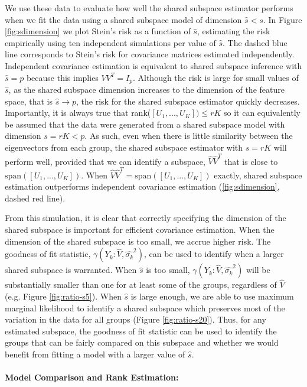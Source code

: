 \documentclass[12pt]{article}
\begin{document}
We use these data to evaluate how well the shared subspace estimator
performs when we fit the data using a shared subspace model of
dimension $\hat{s} < s$.  In Figure \ref{fig:sdimension} we plot
Stein's risk as a function of $\hat{s}$, estimating the risk
empirically using ten independent simulations per value of $\hat{s}$.
The dashed blue line corresponds to Stein's risk for covariance
matrices estimated independently.  Independent covariance estimation
is equivalent to shared subspace inference with $\hat{s} = p$ because
this implies $VV^T = I_p$.  Although the risk is large for small
values of $\hat{s}$, as the shared subspace dimension increases to the
dimension of the feature space, that is $\hat{s} \rightarrow p$, the
risk for the shared subspace estimator quickly decreases.
Importantly, it is always true that rank($[U_1, ..., U_K]) \leq rK$ so
it can equivalently be assumed that the data were generated from a
shared subspace model with dimension $s = rK < p$.  As such, even when
there is little similarity between the eigenvectors from each group,
the shared subspace estimator with $\hat{s} = rK$ will perform well,
provided that we can identify a subspace, $\hat{V}\hat{V}^T$ that is
close to $\text{span}([U_1, ..., U_K])$. When
$\hat{V}\hat{V}^T = \text{span}([U_1, ..., U_K])$ exactly, shared
subspace estimation outperforms independent covariance estimation
(\ref{fig:sdimension}, dashed red line).

From this simulation, it is clear that correctly specifying the
dimension of the shared subspace is important for efficient covariance
estimation.  When the dimension of the shared subspace is too small,
we accrue higher risk.  The goodness of fit statistic,
$\gamma(Y_k: \hat{V}, \hat{\sigma_k}^2)$, can be used to identify when
a larger shared subspace is warranted.  When $\hat{s}$ is too small,
$\gamma(Y_k: \hat{V}, \hat{\sigma_k}^2)$ will be substantially smaller
than one for at least some of the groups, regardless of $\hat{V}$
(e.g. Figure \ref{fig:ratio-s5}).  When $\hat{s}$ is large enough, we
are able to use maximum marginal likelihood to identify a shared
subspace which preserves most of the variation in the data for all
groups (Figure \ref{fig:ratio-s20}).  Thus, for any estimated
subspace, the goodness of fit statistic can be used to identify the
groups that can be fairly compared on this subspace and whether we
would benefit from fitting a model with a larger value of $\hat{s}$.

\paragraph{Model Comparison and Rank Estimation:}
\end{document}
